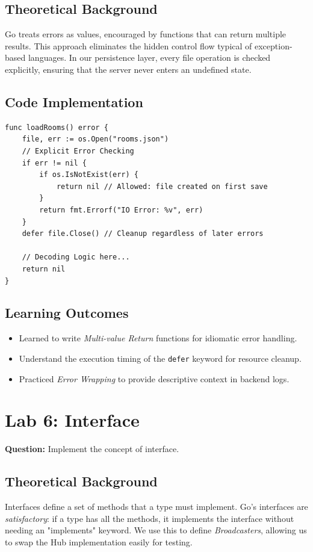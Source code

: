 \documentclass[12pt,a4paper]{article}
\begin{document}
\subsection{Theoretical Background}
Go treats errors as values, encouraged by functions that can return multiple results. This approach eliminates the hidden control flow typical of exception-based languages. In our persistence layer, every file operation is checked explicitly, ensuring that the server never enters an undefined state.

\subsection{Code Implementation}
\begin{lstlisting}
func loadRooms() error {
	file, err := os.Open("rooms.json")
    // Explicit Error Checking
	if err != nil {
		if os.IsNotExist(err) {
			return nil // Allowed: file created on first save
		}
		return fmt.Errorf("IO Error: %v", err)
	}
	defer file.Close() // Cleanup regardless of later errors
    
    // Decoding Logic here...
    return nil
}
\end{lstlisting}

\subsection{Learning Outcomes}
\begin{itemize}
    \item Learned to write \textit{Multi-value Return} functions for idiomatic error handling.
    \item Understand the execution timing of the \texttt{defer} keyword for resource cleanup.
    \item Practiced \textit{Error Wrapping} to provide descriptive context in backend logs.
\end{itemize}

\newpage
\section{Lab 6: Interface}
\textbf{Question:} Implement the concept of interface.

\subsection{Theoretical Background}
Interfaces define a set of methods that a type must implement. Go's interfaces are \textit{satisfactory}: if a type has all the methods, it implements the interface without needing an "implements" keyword. We use this to define \textit{Broadcasters}, allowing us to swap the Hub implementation easily for testing.
\end{document}
